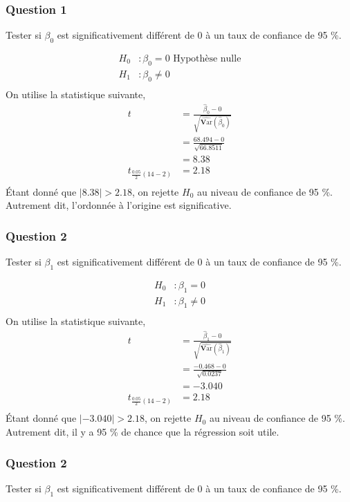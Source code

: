 \documentclass[11pt,french]{report}
\newcommand{\Var}{\mathrm{\textbf{V}ar}}
\begin{document}
\subsubsection*{Question 1}
Tester si $\beta_0$ est significativement différent de 0 à un taux de confiance de 95 \%.

\begin{align*}
H_0 &: \beta_0 = 0 \text{ Hypothèse nulle} \\
H_1 &: \beta_0 \neq 0 \\
\end{align*}
On utilise la statistique suivante,
\begin{align*}
t &= \frac{\hat{\beta}_0 - 0 }{\sqrt{\widehat{\Var}(\hat{\beta}_0)}} \\
&= \frac{68.494 - 0}{\sqrt{66.8511}}\\
&= 8.38\\
t_{\frac{0.05}{2}(14-2)} &= 2.18 \\
\end{align*}
Étant donné que $|8.38| > 2.18$, on rejette $H_0$ au niveau de confiance de 95 \%. Autrement dit, l'ordonnée à l'origine est significative.

\subsubsection*{Question 2}
Tester si $\beta_1$ est significativement différent de 0 à un taux de confiance de 95 \%.

\begin{align*}
H_0 &: \beta_1 = 0\\
H_1 &: \beta_1 \neq 0 \\
\end{align*}
On utilise la statistique suivante,
\begin{align*}
t &= \frac{\hat{\beta}_1 - 0 }{\sqrt{\widehat{\Var}(\hat{\beta}_1)}} \\
&= \frac{-0.468 - 0}{\sqrt{0.0237}}\\
&= -3.040\\
t_{\frac{0.05}{2}(14-2)} &= 2.18\\
\end{align*}
Étant donné que $|-3.040| > 2.18$, on rejette $H_0$ au niveau de confiance de 95 \%. Autrement dit, il y a 95 \% de chance que la régression soit utile.

\subsubsection*{Question 2}
Tester si $\beta_1$ est significativement différent de 0 à un taux de confiance de 95 \%.
\end{document}

